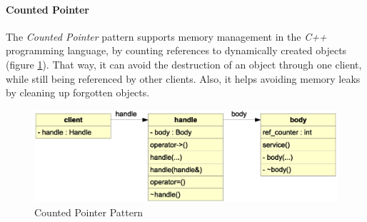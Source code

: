 %
%
%
%
%
%
%

\paragraph{Counted Pointer}
\label{counted_pointer_heading}

The \emph{Counted Pointer} pattern \cite{buschmann} supports memory management
in the \emph{C++} programming language, by counting references to dynamically
created objects (figure \ref{pointer_figure}). That way, it can avoid the
destruction of an object through one client, while still being referenced by
other clients. Also, it helps avoiding memory leaks by cleaning up forgotten
objects.

\begin{figure}[ht]
    \begin{center}
        \includegraphics[scale=0.3]{vector/pointer.eps}
        \caption{Counted Pointer Pattern}
        \label{pointer_figure}
    \end{center}
\end{figure}
